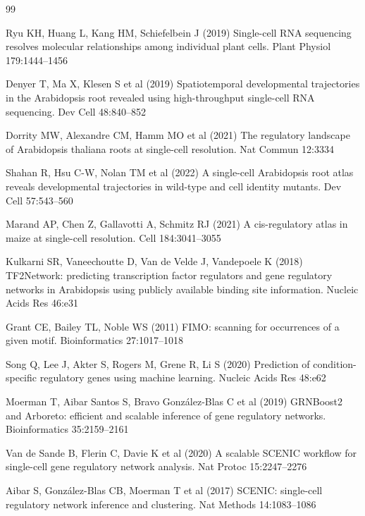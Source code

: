 \documentclass[11pt,a4paper]{article}
\begin{document}
\begin{thebibliography}{99}
\setlength{\itemsep}{2pt}

 Ryu KH, Huang L, Kang HM, Schiefelbein J (2019) Single-cell RNA sequencing resolves molecular relationships among individual plant cells. Plant Physiol 179:1444--1456

 Denyer T, Ma X, Klesen S et al (2019) Spatiotemporal developmental trajectories in the Arabidopsis root revealed using high-throughput single-cell RNA sequencing. Dev Cell 48:840--852

 Dorrity MW, Alexandre CM, Hamm MO et al (2021) The regulatory landscape of Arabidopsis thaliana roots at single-cell resolution. Nat Commun 12:3334

 Shahan R, Hsu C-W, Nolan TM et al (2022) A single-cell Arabidopsis root atlas reveals developmental trajectories in wild-type and cell identity mutants. Dev Cell 57:543--560

 Marand AP, Chen Z, Gallavotti A, Schmitz RJ (2021) A cis-regulatory atlas in maize at single-cell resolution. Cell 184:3041--3055

 Kulkarni SR, Vaneechoutte D, Van de Velde J, Vandepoele K (2018) TF2Network: predicting transcription factor regulators and gene regulatory networks in Arabidopsis using publicly available binding site information. Nucleic Acids Res 46:e31

 Grant CE, Bailey TL, Noble WS (2011) FIMO: scanning for occurrences of a given motif. Bioinformatics 27:1017--1018

 Song Q, Lee J, Akter S, Rogers M, Grene R, Li S (2020) Prediction of condition-specific regulatory genes using machine learning. Nucleic Acids Res 48:e62

 Moerman T, Aibar Santos S, Bravo Gonz\'alez-Blas C et al (2019) GRNBoost2 and Arboreto: efficient and scalable inference of gene regulatory networks. Bioinformatics 35:2159--2161

 Van de Sande B, Flerin C, Davie K et al (2020) A scalable SCENIC workflow for single-cell gene regulatory network analysis. Nat Protoc 15:2247--2276

 Aibar S, Gonz\'alez-Blas CB, Moerman T et al (2017) SCENIC: single-cell regulatory network inference and clustering. Nat Methods 14:1083--1086


\end{thebibliography}
\end{document}
